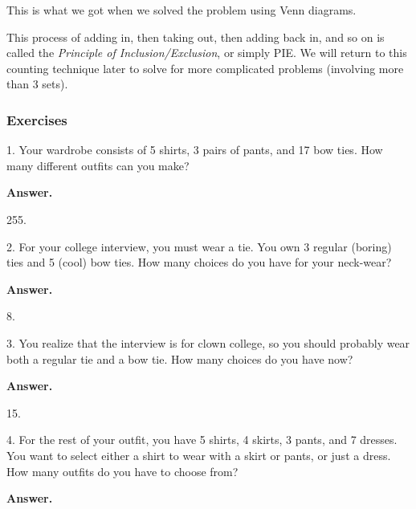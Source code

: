 \documentclass[10pt,]{book}
\theoremstyle{plain}
\theoremstyle{definition}
\theoremstyle{definition}
\theoremstyle{definition}
\numberwithin{equation}{section}
\begin{document}
This is what we got when we solved the problem using Venn diagrams.
%
\par

This process of adding in, then taking out, then adding back in, and so on is called the \emph{Principle of Inclusion/Exclusion}, or simply PIE. We will return to this counting technique later to solve for more complicated problems (involving more than 3 sets).
%
\typeout{************************************************}
\typeout{************************************************}
\subsubsection[Exercises]{Exercises}\label{exercises-1}
\begin{exerciselist}
\item[1.]\hypertarget{exercise-1}{}
Your wardrobe consists of 5 shirts, 3 pairs of pants, and 17 bow ties. How many different outfits can you make?
%
\par\smallskip
\par\smallskip
\noindent\textbf{Answer.}\hypertarget{answer-1}{}\quad

255.
%
\item[2.]\hypertarget{exercise-2}{}
For your college interview, you must wear a tie. You own 3 regular (boring) ties and 5 (cool) bow ties. How many choices do you have for your neck-wear?
%
\par\smallskip
\par\smallskip
\noindent\textbf{Answer.}\hypertarget{answer-2}{}\quad

8.
%
\item[3.]\hypertarget{exercise-3}{}
You realize that the interview is for clown college, so you should probably wear both a regular tie and a bow tie. How many choices do you have now?
%
\par\smallskip
\par\smallskip
\noindent\textbf{Answer.}\hypertarget{answer-3}{}\quad

15.
%
\item[4.]\hypertarget{exercise-4}{}
For the rest of your outfit, you have 5 shirts, 4 skirts, 3 pants, and 7 dresses. You want to select either a shirt to wear with a skirt or pants, or just a dress. How many outfits do you have to choose from?
%
\par\smallskip
\par\smallskip
\noindent\textbf{Answer.}\hypertarget{answer-4}{}\quad


\end{exerciselist}
\end{document}
